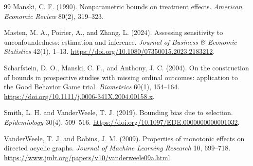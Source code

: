 \documentclass[11pt]{article}
\theoremstyle{definition}
\theoremstyle{plain}
\theoremstyle{remark}
\begin{document}
\begin{thebibliography}{99}
Manski, C. F. (1990).
Nonparametric bounds on treatment effects.
\emph{American Economic Review} 80(2), 319--323.

Masten, M. A., Poirier, A., and Zhang, L. (2024).
Assessing sensitivity to unconfoundedness: estimation and inference.
\emph{Journal of Business \& Economic Statistics} 42(1), 1--13.
\url{https://doi.org/10.1080/07350015.2023.2183212}.

Scharfstein, D. O., Manski, C. F., and Anthony, J. C. (2004).
On the construction of bounds in prospective studies with missing ordinal outcomes: application to the Good Behavior Game trial.
\emph{Biometrics} 60(1), 154--164.
\url{https://doi.org/10.1111/j.0006-341X.2004.00158.x}.

Smith, L. H. and VanderWeele, T. J. (2019).
Bounding bias due to selection.
\emph{Epidemiology} 30(4), 509--516.
\url{https://doi.org/10.1097/EDE.0000000000001032}.

VanderWeele, T. J. and Robins, J. M. (2009).
Properties of monotonic effects on directed acyclic graphs.
\emph{Journal of Machine Learning Research} 10, 699--718.
\url{https://www.jmlr.org/papers/v10/vanderweele09a.html}.
\end{thebibliography}
\end{document}
